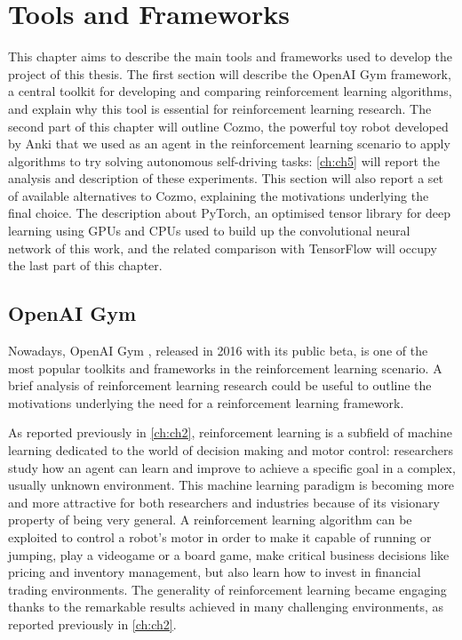 \chapter{Tools and Frameworks} \label{ch:ch3}

This chapter aims to describe the main tools and frameworks used to develop the project of this thesis.
The first section will describe the OpenAI Gym framework, a central toolkit for developing and comparing reinforcement learning algorithms, and explain why this tool is essential for reinforcement learning research.
The second part of this chapter will outline Cozmo, the powerful toy robot developed by Anki that we used as an agent in the reinforcement learning scenario to apply algorithms to try solving autonomous self-driving tasks: \vref{ch:ch5} will report the analysis and description of these experiments.
This section will also report a set of available alternatives to Cozmo, explaining the motivations underlying the final choice.
The description about PyTorch, an optimised tensor library for deep learning using GPUs and CPUs used to build up the convolutional neural network of this work, and the related comparison with TensorFlow will occupy the last part of this chapter.

\section{OpenAI Gym}

Nowadays, OpenAI Gym \cite{brockman2016openai}, released in 2016 with its public beta, is one of the most popular toolkits and frameworks in the reinforcement learning scenario.
A brief analysis of reinforcement learning research could be useful to outline the motivations underlying the need for a reinforcement learning framework.

As reported previously in  \vref{ch:ch2}, reinforcement learning is a subfield of machine learning dedicated to the world of decision making and motor control: researchers study how an agent can learn and improve to achieve a specific goal in a complex, usually unknown environment.
This machine learning paradigm is becoming more and more attractive for both researchers and industries because of its visionary property of being very general.
A reinforcement learning algorithm can be exploited to control a robot's motor in order to make it capable of running or jumping, play a videogame or a board game, make critical business decisions like pricing and inventory management, but also learn how to invest in financial trading environments.
The generality of reinforcement learning became engaging thanks to the remarkable results achieved in many challenging environments, as reported previously in \vref{ch:ch2}.

